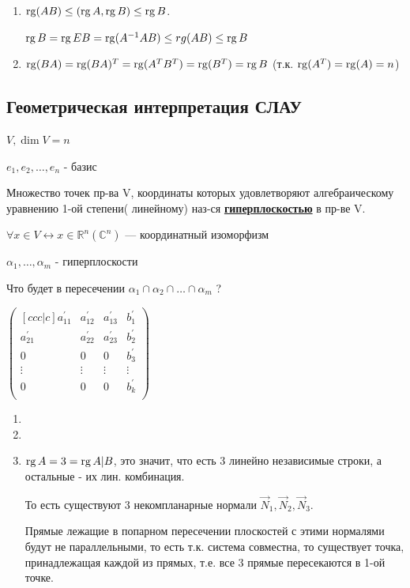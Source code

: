 \prooff{}
\begin{enumerate}
    \item
          $\operatorname{rg}(AB)\leq (\operatorname{rg} A, \operatorname{rg} B)\leq \operatorname{rg} B$.

          $\operatorname{rg} B = \operatorname{rg} EB = \operatorname{rg} (A^{-1}AB)\leq rg(AB) \leq \operatorname{rg} B$
    \item
          $\operatorname{rg}(BA) = \operatorname{rg}(BA)^T = \operatorname{rg}(A^T B^T)= \operatorname{rg}(B^T) = \operatorname{rg} B$ (т.к. $\operatorname{rg}(A^T) = \operatorname{rg}(A) = n$)
\end{enumerate}


\subsection{Геометрическая интерпретация СЛАУ}
\(V, \dim V = n\)

\(e_1,e_2,\ldots, e_n\) - базис

Множество точек пр-ва V, координаты которых удовлетворяют алгебраическому уравнению 1-ой степени( линейному) наз-ся \uline{\textbf{гиперплоскостью}} в пр-ве V.

$\forall x \in V \leftrightarrow x \in \mathbb{R}^n(\mathbb{C}^n)$ --- координатный изоморфизм

$\alpha_1,\ldots,\alpha_m$ - гиперплоскости

Что будет в пересечении $\alpha_1 \cap \alpha_2 \cap \ldots \cap \alpha_m$ ?



\(
\begin{pmatrix}[ccc|c]
    a_{11}^{\prime} & a_{12}^{\prime} & a_{13}^{\prime} & b_{1}^{\prime} \\
    a_{21}^{\prime} & a_{22}^{\prime} & a_{23}^{\prime} & b_{2}^{\prime} \\
    0               & 0               & 0               & b_{3}^{\prime} \\
    \vdots          & \vdots          & \vdots          & \vdots         \\
    0               & 0               & 0               & b_{k}^{\prime} \\
\end{pmatrix}
\)

\begin{enumerate}
    \item
    \item
    \item \(\operatorname{rg} A = 3 = \operatorname{rg} A | B\), это значит, что есть 3 линейно независимые строки, а остальные - их лин. комбинация.

          То есть существуют 3 некомпланарные нормали \(\vec N_1, \vec N_2, \vec N_3\).

          Прямые лежащие в попарном пересечении плоскостей с этими нормалями будут не параллельными, то есть т.к. система совместна, то существует точка, принадлежащая каждой из прямых, т.е. все 3 прямые пересекаются в 1-ой точке.
\end{enumerate}

